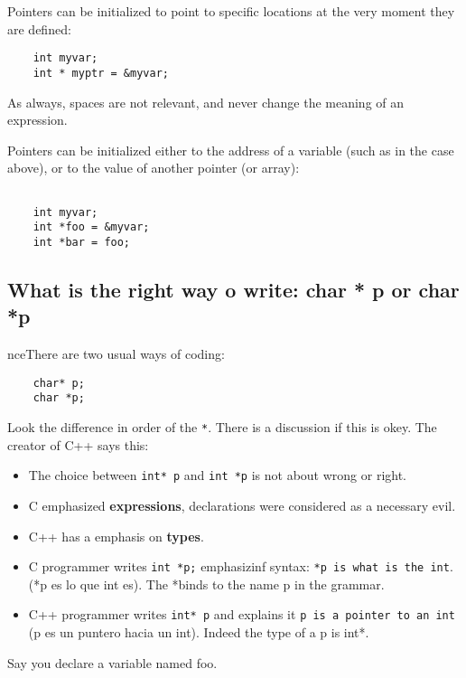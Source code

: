 \documentclass[12pt]{article}
\begin{document}
\begin{itemize}
	Pointers can be initialized to point to specific locations at the very moment they are defined:

	\begin{verbatim}
	int myvar; 
	int * myptr = &myvar; 
	\end{verbatim}

	As always, spaces are not relevant, and never change the meaning of an expression.

	Pointers can be initialized either to the address of a variable (such as in the case above), or to the value of another pointer (or array):

	\begin{verbatim}

	int myvar;
	int *foo = &myvar;
	int *bar = foo;
	\end{verbatim}

	\subsection{What is the right way o write: char * p or char *p}

	nceThere are two usual ways of coding:
	\begin{verbatim}
	char* p;
	char *p;
	\end{verbatim}

	Look the difference in order of the \verb|*|. There is a discussion if this is okey. The creator of C++ says this:

	\begin{itemize}
	\item The choice between \verb|int* p| and \verb|int *p| is not about wrong or right.
	\item C emphasized \textbf{expressions}, declarations were considered as a necessary evil.
	\item C++ has a emphasis on \textbf{types}.
	\item C programmer writes \verb|int *p;| emphasizinf syntax: \verb|*p is what is the int|. (*p es lo que int es).  The *binds to the name p in the grammar.
	\item C++ programmer writes \verb|int* p| and explains it \verb|p is a pointer to an int| (p es un puntero hacia un int). Indeed the type of a p is int*.

	\end{itemize}



	Say you declare a variable named foo.


\end{itemize}
\end{document}
